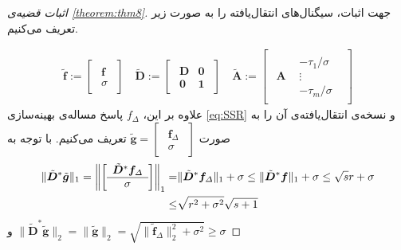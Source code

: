 \begin{proof}[اثبات قضیه‌ی \ref{theorem:thm8}]
جهت اثبات، سیگنال‌های انتقال‌یافته را به صورت زیر تعریف می‌کنیم.

\begin{align}
\tilde{\bm{f}} :=
\begin{bmatrix}
\begin{array}{c}
\bm{f} \\
\hline
\sigma
\end{array}
\end{bmatrix}
\quad
\tilde{\bm{D}} :=
\begin{bmatrix}
\begin{array}{c|c}
\bm{D} & \bm{0}\\
\hline
\bm{0} & \bm{1}
\end{array}
\end{bmatrix}
\quad
\tilde{\bm{A}} :=
\begin{bmatrix}
\begin{array}{c|c}
\bm{A}& 
\begin{array}{c}
-\tau_{1}/\sigma \\ \vdots \\-\tau_{m}/\sigma
\end{array}
\end{array}
\end{bmatrix}
\end{align}
علاوه بر این،
$f_{\varDelta}$
پاسخ مساله‌ی بهینه‌سازی
\eqref{eq:SSR}
و نسخه‌ی انتقال‌یافته‌ی آن را به صورت
$ \tilde{\bm{g}}=\begin{bmatrix}
\begin{array}{c}
\bm{f}_{\varDelta} \\
\hline
\sigma
\end{array}
\end{bmatrix} $	
تعریف می‌کنیم. با توجه به 
\begin{align*}
\|\tilde{\bm{D}}^{\ast} \tilde{\bm{g}}\|_{1} = \left\lVert
\begin{bmatrix}
\begin{array}{c}
\tilde{\bm{D}}^{\ast}\bm{f}_{\varDelta} \\
\hline
\sigma
\end{array}
\end{bmatrix} 	
\right\rVert_{1} =& \|\tilde{\bm{D}}^{\ast}\bm{f}_{\varDelta}\|_{1}+\sigma 
\leq \|\tilde{\bm{D}}^{\ast}\bm{f}\|_{1}+\sigma \leq \sqrt{s}r+\sigma \\
\leq & \sqrt{r^2+\sigma^2}\sqrt{s+1}
\end{align*}
و
$ \|\tilde{\bm{D}}^{\ast} \tilde{\bm{g}}\|_{2} = \|\tilde{\bm{g}} \|_{2}= \sqrt{\|\tilde{\bm{f}}_{\varDelta}\|_{2}^{2}+\sigma^2} \geq \sigma$

\end{proof}
